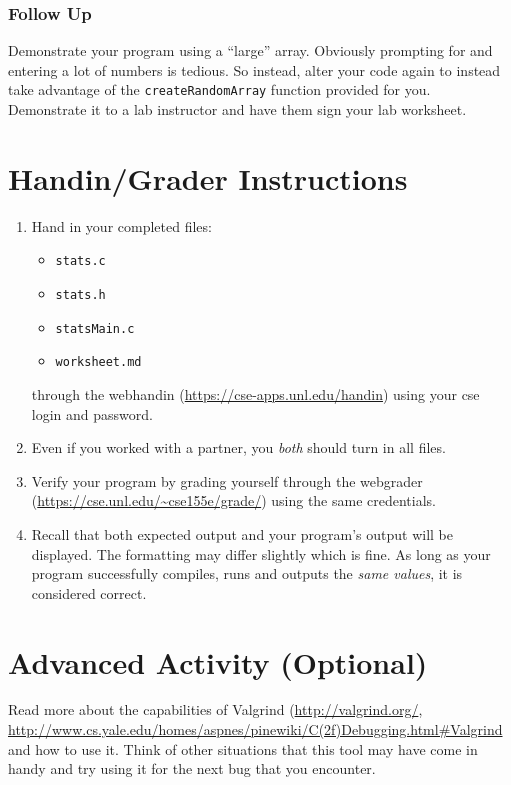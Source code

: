 \documentclass[12pt]{scrartcl}
\begin{document}
\subsubsection*{Follow Up}

Demonstrate your program using a ``large'' array.  Obviously prompting 
for and entering a lot of numbers is tedious.  So instead, alter your code 
again to instead take advantage of the \texttt{createRandomArray} 
function provided for you.  Demonstrate it to a lab instructor and have 
them sign your lab worksheet. 

\section{Handin/Grader Instructions}

\begin{enumerate}
  \item Hand in your completed files:
  \begin{itemize}
    \item \texttt{stats.c}
    \item \texttt{stats.h}
    \item \texttt{statsMain.c}
    \item \texttt{worksheet.md}
  \end{itemize}
  through the webhandin (\url{https://cse-apps.unl.edu/handin}) 
  using your cse login and password.  
  \item Even if you worked with a partner, you \emph{both} should
  turn in all files.
  \item Verify your program by grading yourself through the
  webgrader (\url{https://cse.unl.edu/~cse155e/grade/}) using the
  same credentials.
  \item Recall that both expected output and your program's output
  will be displayed.  The formatting may differ slightly which is fine.
  As long as your program successfully compiles, runs and outputs 
  the \emph{same values}, it is considered correct.
\end{enumerate}


\section{Advanced Activity (Optional)}

Read more about the capabilities of Valgrind (\url{http://valgrind.org/}, 
\url{http://www.cs.yale.edu/homes/aspnes/pinewiki/C(2f)Debugging.html#Valgrind}
and how to use it.  Think of other situations that this tool may have come in
handy and try using it for the next bug that you encounter.  
\end{document}
